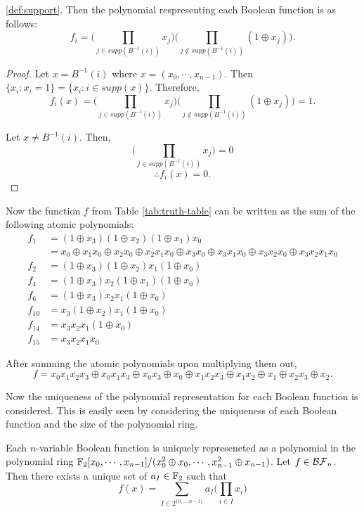 \ref{def:support}. Then the polynomial respresenting each Boolean function
is as follows:
\begin{equation}\label{eqn:atomic-ANF}
  f_i=\bigg(\prod_{j\in supp(B^{-1}(i))}x_j\bigg)
    \bigg(\prod_{j\not\in supp(B^{-1}(i))}(1\oplus x_j)\bigg).
\end{equation}
\begin{proof}
  Let $x=B^{-1}(i)$ where $x=(x_0,\cdots,x_{n-1})$. Then
  $\{x_i:x_i=1\}=\{x_i:i\in supp(x)\}$. Therefore,
  \[
  f_i(x)=\bigg(\prod_{j\in supp(B^{-1}(i))}x_j\bigg)
    \bigg(\prod_{j\not\in supp(B^{-1}(i))}(1\oplus x_j)\bigg)=1.
  \]

  Let $x\not=B^{-1}(i)$. Then,
  \[
  \bigg(\prod_{j\in supp(B^{-1}(i))}x_j\bigg)=0
  \]\[
  \therefore f_i(x)=0.
  \]
\end{proof}

\par Now the function $f$ from Table \ref{tab:truth-table} can be written as
the sum of the following atomic polynomials:
\begin{align*}
  f_1   &=(1\oplus x_3)(1\oplus x_2)(1\oplus x_1)x_0\\
        &=x_0 \oplus x_1x_0 \oplus x_2x_0 \oplus x_2x_1x_0 \oplus
          x_3x_0 \oplus x_3x_1x_0 \oplus x_3x_2x_0 \oplus x_3x_2x_1x_0\\
  f_2   &=(1\oplus x_3)(1\oplus x_2)x_1(1\oplus x_0)\\
  f_4   &=(1\oplus x_3)x_2(1\oplus x_1)(1\oplus x_0)\\
  f_6   &=(1\oplus x_3)x_2x_1(1\oplus x_0)\\
  f_{10}&=x_3(1\oplus x_2)x_1(1\oplus x_0)\\
  f_{14}&=x_3x_2x_1(1\oplus x_0)\\
  f_{15}&=x_3x_2x_1x_0
\end{align*}
\par After summing the atomic polynomials upon multiplying them out,
\[
	f=x_0x_1x_2x_3\oplus x_0x_1x_3 \oplus x_0x_3 \oplus x_0 \oplus x_1x_2x_3
    \oplus x_1x_2\oplus x_1\oplus x_2x_3 \oplus x_2.
\]

\par Now the uniqueness of the polynomial representation for each Boolean
function is considered. This is easily seen by considering the uniqueness of
each Boolean function and the size of the polynomial ring.

\begin{theorem}
Each $n$-variable Boolean function is uniquely represeneted as a polynomial
in the polynomial ring $\mathbb{F}_2[x_0,\cdots,x_{n-1}]/ (x_0^2\oplus x_0,\cdots,
x_{n-1}^2 \oplus x_{n-1})$. Let $f\in\mathcal{BF}_n$. Then there exists a unique set
of $a_I\in\mathbb{F}_2$ such that
\begin{equation}\label{eqn:ANF}
  f(x)=\sum_{I\in2^{\{0,\dots,n-1\}}}a_I\bigg(\prod_{i\in I}x_i\bigg)
\end{equation}
\end{theorem}


